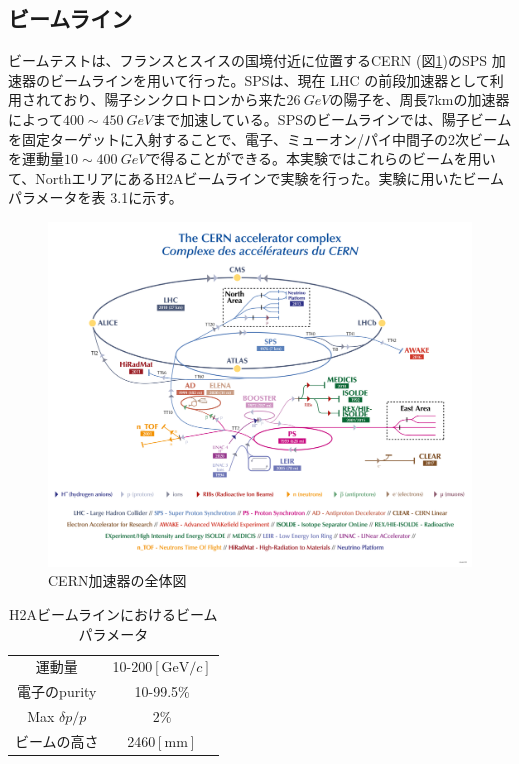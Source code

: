\subsection{ビームライン}
ビームテストは、フランスとスイスの国境付近に位置するCERN (図\ref{cernmapping})のSPS 加速器のビームラインを用いて行った。SPSは、現在 LHC の前段加速器として利用されており、陽子シンクロトロンから来た$\SI{26}{GeV}$の陽子を、周長7kmの加速器によって$400\sim \SI{450}{GeV}$まで加速している。SPSのビームラインでは、陽子ビームを固定ターゲットに入射することで、電子、ミューオン/パイ中間子の2次ビームを運動量$10\sim \SI{400}{GeV}$で得ることができる。本実験ではこれらのビームを用いて、NorthエリアにあるH2Aビームラインで実験を行った。実験に用いたビームパラメータを表 3.1に示す。\\
\begin{figure}[H]
	\begin{center}
 \includegraphics[keepaspectratio, scale=0.7]
 	{Figure/Beamtest/cern.png}
 		\caption{CERN加速器の全体図~\cite{cernmap}}
		\label{cernmapping}
	\end{center}
\end{figure}
\begin{table}[H]
 \centering
 \begin{tabular}{c c}
 \hline
運動量 & 10-200$[ \mathrm{GeV}/ c ]$\\
電子のpurity & 10-99.5\%\\
Max $\delta p / p$  & $2\%$\\
ビームの高さ & 2460$[ \mathrm{mm}]$\\
 \hline
 \end{tabular}
 \caption{H2Aビームラインにおけるビームパラメータ}
\end{table}

